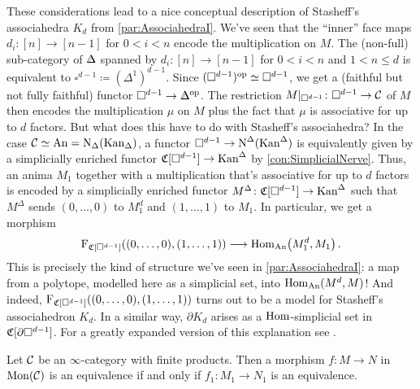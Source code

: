 \begin{numpar}
	These considerations lead to a nice conceptual description of Stasheff's associahedra $K_d$ from \cref{par:AssociahedraI}. We've seen that the \enquote{inner} face maps $d_i\colon [n]\rightarrow [n-1]$ for $0<i<n$ encode the multiplication on $M$. The (non-full) sub-category of $\IDelta$ spanned by $d_i\colon [n]\rightarrow [n-1]$ for $0<i<n$ and $1<n\leqslant d$ is equivalent to $\square^{d-1}\coloneqq (\Delta^1)^{d-1}$. Since $(\square^{d-1})^{\mathrm{op}}\simeq \square^{d-1}$, we get a (faithful but not fully faithful) functor $\square^{d-1}\rightarrow\IDelta^\op$. The restriction $M|_{\square^{d-1}}\colon \square^{d-1}\rightarrow \mathcal{C}$ of $M$ then encodes the multiplication $\mu$ on $M$ plus the fact that $\mu$ is associative for up to $d$ factors. But what does this have to do with Stasheff's associahedra? In the case $\mathcal{C}\simeq \mathrm{An}=\operatorname{N}_\Delta(\mathrm{Kan}_\Delta)$, a functor $\square^{d-1}\rightarrow\operatorname{N}^\Delta(\mathrm{Kan}^\Delta)$ is equivalently given by a simplicially enriched functor $\mathfrak{C}[\square^{d-1}]\rightarrow\mathrm{Kan}^\Delta$ by \cref{con:SimplicialNerve}. Thus, an anima $M_1$ together with a multiplication that's associative for up to $d$ factors is encoded by a simplicially enriched functor $M^\Delta\colon\mathfrak{C}[\square^{d-1}]\rightarrow\mathrm{Kan}^\Delta$ such that $M^\Delta$ sends $(0,\dotsc,0)$ to $M_1^d$ and $(1,\dotsc,1)$ to $M_1$. In particular, we get a morphism
	\begin{equation*}
		\F_{\CC[\square^{d-1}]}\left((0,\dotsc,0),(1,\dotsc,1)\right)\longrightarrow \Hom_{\cat{An}}\bigl(M_1^d,M_1\bigr)\,.
	\end{equation*}
	This is precisely the kind of structure we've seen in \cref{par:AssociahedraI}: a map from a polytope, modelled here as a simplicial set, into $\operatorname{Hom}_{\mathrm{An}}(M^d,M)$! And indeed, $\operatorname{F}_{\mathfrak{C}[\square^{d-1}]}((0,\dotsc,0),(1,\dotsc,1))$ turns out to be a model for Stasheff's associahedron $K_d$. In a similar way, $\partial K_d$ arises as a $\operatorname{Hom}$-simplicial set in $\mathfrak{C}[\partial\square^{d-1}]$. For a greatly expanded version of this explanation see \cite[\S\href{https://people.math.harvard.edu/~lurie/papers/HA.pdf\#subsection.4.1.6}{4.1.6}]{HA}.
\end{numpar}
\begin{lem}\label{lem:E1MonoidsEquivalenceOnUnderlyingObjects}
	Let $\mathcal{C}$ be an $\infty$-category with finite products. Then a morphism $f\colon M\rightarrow N$ in $\mathrm{Mon}(\mathcal{C})$ is an equivalence if and only if $f_1\colon M_1\rightarrow N_1$ is an equivalence. 
\end{lem}
